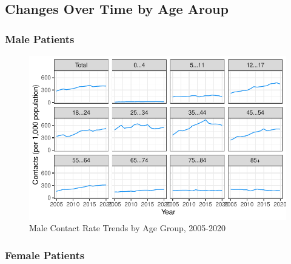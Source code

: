 \documentclass[
  a4paper,
  DIV=11,
  numbers=noendperiod]{scrreport}
\begin{document}
\hypertarget{changes-over-time-by-age-aroup}{%
\subsection{Changes Over Time by Age
Aroup}\label{changes-over-time-by-age-aroup}}

\hypertarget{male-patients}{%
\subsubsection{Male Patients}\label{male-patients}}

\begin{figure}

\caption{\label{fig-cmhc-cam}Male Contact Rate Trends by Age Group,
2005-2020}

{\centering \includegraphics{./chap2-cmhc_files/figure-pdf/fig-cmhc-cam-1.pdf}

}

\end{figure}

\hypertarget{female-patients}{%
\subsubsection{Female Patients}\label{female-patients}}
\end{document}
